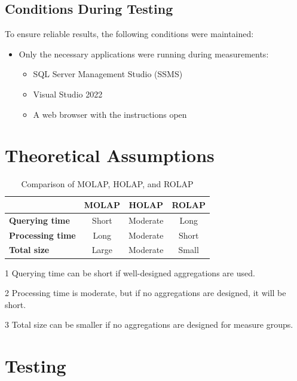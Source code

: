 \documentclass[a4paper,12pt]{article} %
\begin{document}
\subsection{Conditions During Testing}
To ensure reliable results, the following conditions were maintained:
\begin{itemize}
    \item Only the necessary applications were running during measurements:
    \begin{itemize}
        \item SQL Server Management Studio (SSMS)
        \item Visual Studio 2022
        \item A web browser with the instructions open
    \end{itemize}
\end{itemize}


\section{Theoretical Assumptions}

\begin{table}[H]
\centering
\caption{Comparison of MOLAP, HOLAP, and ROLAP}
\label{tab:comparison}
\begin{threeparttable}
\begin{tabular}{lccc}
\toprule
 & MOLAP & HOLAP & ROLAP \\
\midrule
\textbf{Querying time} & Short & Moderate\footnotemark[1] & Long \\
\textbf{Processing time} & Long & Moderate\footnotemark[2] & Short \\
\textbf{Total size} & Large\footnotemark[3] & Moderate & Small \\
\bottomrule
\end{tabular}
\begin{tablenotes}
\item[1] Querying time can be short if well-designed aggregations are used.
\item[2] Processing time is moderate, but if no aggregations are designed, it will be short.
\item[3] Total size can be smaller if no aggregations are designed for measure groups.
\end{tablenotes}
\end{threeparttable}
\end{table}


\newpage
\section{Testing}
\end{document}
